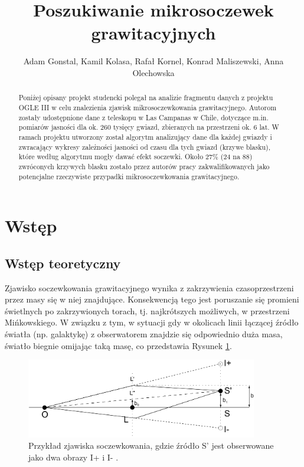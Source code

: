 \documentclass[a4paper,11pt]{article}
\author{Adam Gonstal, Kamil Kolasa, Rafał Kornel, Konrad Maliszewski, Anna Olechowska}
\title{Poszukiwanie mikrosoczewek grawitacyjnych}
\newcommand{\ak}{\hspace{0.7 cm}}
\begin{document}
\maketitle
\newpage
\begin{abstract}
\nocite{*}
\ak Poniżej opisany projekt studencki polegał na analizie fragmentu danych z projektu OGLE III w celu znalezienia zjawisk mikrosoczewkowania grawitacyjnego.  Autorom zostały udostępnione dane z teleskopu w Las Campanas w Chile, dotyczące m.in. pomiarów jasności dla ok. $260$ tysięcy  gwiazd, zbieranych na przestrzeni ok. $6$ lat. W ramach projektu utworzony został algorytm analizujący dane dla każdej gwiazdy i zwracający wykresy zależności jasności od czasu dla tych gwiazd (krzywe blasku), które według algorytmu mogły dawać efekt soczewki. Około $27$\% (24 na 88) zwróconych krzywych blasku zostało przez autorów pracy zakwalifikowanych jako potencjalne rzeczywiste przypadki mikrosoczewkowania grawitacyjnego.
\end{abstract}
\tableofcontents
\newpage
\section{Wstęp}
\subsection{Wstęp teoretyczny}
\ak Zjawisko soczewkowania grawitacyjnego wynika z zakrzywienia czasoprzestrzeni przez masy się w niej znajdujące. Konsekwencją tego jest poruszanie się promieni świetlnych po zakrzywionych torach, tj. najkrótszych możliwych, w przestrzeni Mińkowskiego. W związku z tym, w sytuacji gdy w okolicach linii łączącej źródło światła (np. galaktykę) z obserwatorem znajdzie się odpowiednio duża masa, światło biegnie omijając taką masę, co przedstawia Rysunek \ref{Fig1}. 

\begin{figure}[H]
\centering
\includegraphics[width=0.9\textwidth]{Lens.jpeg}
\caption{Przykład zjawiska soczewkowania, gdzie źródło S' jest obserwowane jako dwa obrazy I+ i I- \citet{Lens}.}
\label{Fig1}
\end{figure}
\end{document}
